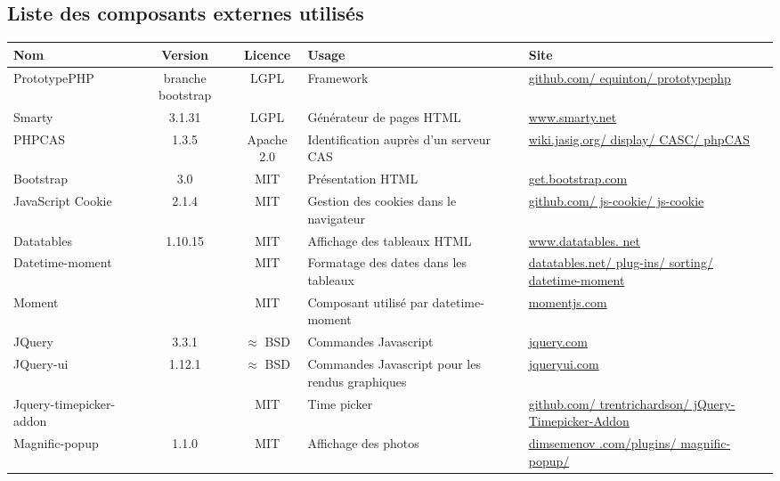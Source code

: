 \subsection{Liste des composants externes utilisés}
\begin{longtable}{|>{\raggedright\arraybackslash}p{3cm}|c|c|>{\raggedright\arraybackslash}p{3cm}|>{\raggedright\arraybackslash}p{3cm}|}
\hline 
\textbf{Nom} & \textbf{Version} & \textbf{Licence} & \textbf{Usage} & \textbf{Site} \\ 
\hline 
\endhead
PrototypePHP & branche bootstrap & LGPL & Framework & \href{https://github.com/equinton/prototypephp}{github.com/ equinton/ prototypephp} \\ 
\hline 
Smarty & 3.1.31 & LGPL & Générateur de pages HTML & \href{http://www.smarty.net}{www.smarty.net} \\ 
\hline 
PHPCAS & 1.3.5 & Apache 2.0 & Identification auprès d'un serveur CAS & \href{https://wiki.jasig.org/display/CASC/phpCAS}{wiki.jasig.org/ display/ CASC/ phpCAS} \\ 
\hline 
Bootstrap & 3.0 & MIT & Présentation HTML & \href{http://getbootstrap.com}{get.bootstrap.com} \\ 
\hline 
JavaScript Cookie & 2.1.4 & MIT & Gestion des cookies dans le navigateur & \href{https://github.com/js-cookie/js-cookie}{github.com/ js-cookie/ js-cookie} \\ 
\hline 
Datatables & 1.10.15 & MIT & Affichage des tableaux HTML & \href{http://www.datatables.net/}{www.datatables. net} \\ 
\hline 
Datetime-moment &  & MIT & Formatage des dates dans les tableaux & \href{https://datatables.net/plug-ins/sorting/datetime-moment}{datatables.net/ plug-ins/ sorting/ datetime-moment} \\ 
\hline 
Moment &  & MIT & Composant utilisé par datetime-moment & \href{http://momentjs.com} {momentjs.com}\\ 
\hline 
JQuery & 3.3.1 & $\approx$ BSD & Commandes Javascript & \href{http://jquery.com/}{jquery.com} \\ 
\hline 
JQuery-ui & 1.12.1 & $\approx$ BSD & Commandes Javascript pour les rendus graphiques & \href{http://jqueryui.com/}{jqueryui.com} \\ 
\hline 
Jquery-timepicker-addon &  & MIT & Time picker & \href{https://github.com/trentrichardson/jQuery-Timepicker-Addon}{github.com/ trentrichardson/ jQuery-Timepicker-Addon} \\ 
\hline 
Magnific-popup & 1.1.0 & MIT & Affichage des photos & \href{http://dimsemenov.com/plugins/magnific-popup/}{dimsemenov .com/plugins/ magnific-popup/}\\ 

\end{longtable}
